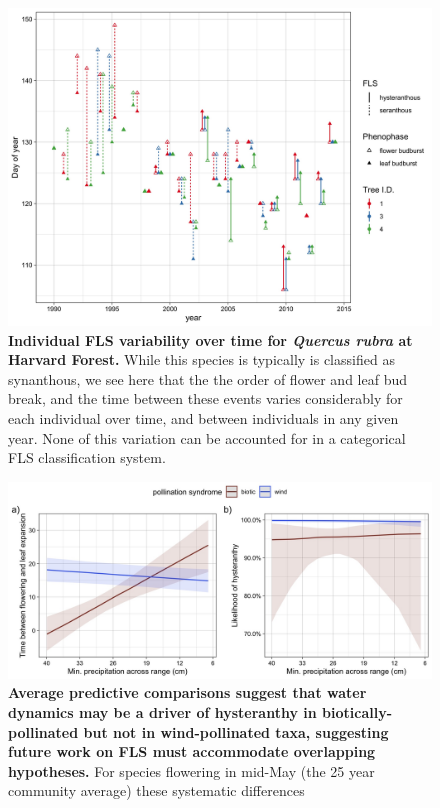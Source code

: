 \documentclass{article}
\begin{document}
 \begin{figure}[ht]
        \centering
          \includegraphics[width=\textwidth]{..//HarvardForest/HF_Q_ru_interannual.jpeg}
          \caption{\textbf{Individual FLS variability over time for \textit{Quercus rubra} at Harvard Forest.} While this species is typically is classified as synanthous, we see here that the the order of flower and leaf bud break, and the time between these events varies considerably for each individual over time, and between individuals in any given year. None of this variation can be accounted for in a categorical FLS classification system.}
        \label{fig:Quercus}
    \end{figure}
    

 \begin{figure}[ht]
        \centering
          \includegraphics[width=\textwidth]{..//HarvardForest/apcs.jpeg}
           \caption{\textbf{Average predictive comparisons suggest that water dynamics may be a driver of hysteranthy in biotically-pollinated but not in wind-pollinated taxa, suggesting future work on FLS must accommodate overlapping hypotheses.} For species flowering in mid-May (the 25 year community average) these systematic differences}
        \label{fig:apcs}
    \end{figure}
\end{document}
